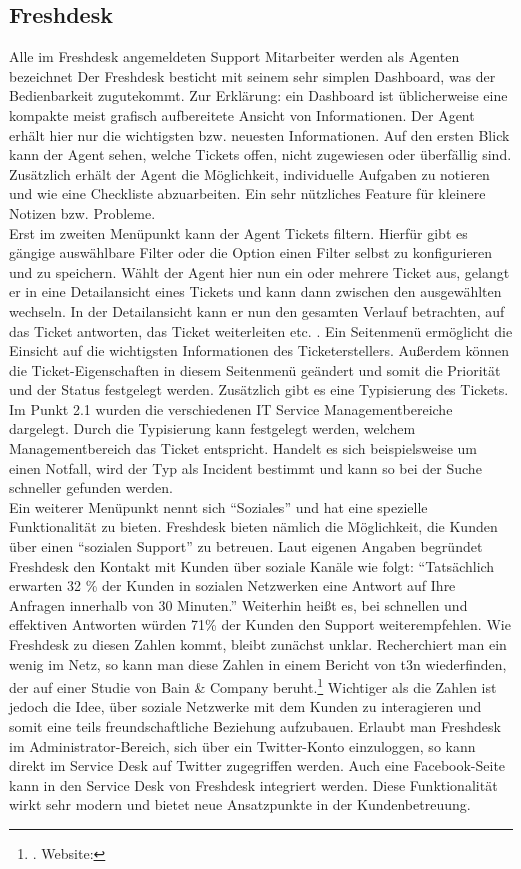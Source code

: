 \subsection{Freshdesk}
\noindent
Alle im Freshdesk angemeldeten Support Mitarbeiter werden als Agenten bezeichnet
Der Freshdesk besticht mit seinem sehr simplen Dashboard, was der Bedienbarkeit zugutekommt. Zur Erklärung: ein Dashboard ist üblicherweise eine kompakte meist grafisch aufbereitete Ansicht von Informationen. Der Agent erhält hier nur die wichtigsten bzw. neuesten Informationen. Auf den ersten Blick kann der Agent sehen, welche Tickets offen, nicht zugewiesen oder überfällig sind. Zusätzlich erhält der Agent die Möglichkeit, individuelle Aufgaben zu notieren und wie eine Checkliste abzuarbeiten. Ein sehr nützliches Feature für kleinere Notizen bzw. Probleme.\\ 
Erst im zweiten Menüpunkt kann der Agent Tickets filtern. Hierfür gibt es gängige auswählbare Filter oder die Option einen Filter selbst zu konfigurieren und zu speichern. Wählt der Agent hier nun ein oder mehrere Ticket aus, gelangt er in eine Detailansicht eines Tickets und kann dann zwischen den ausgewählten wechseln. In der Detailansicht kann er nun den gesamten Verlauf betrachten, auf das Ticket antworten, das Ticket weiterleiten etc. . Ein Seitenmenü ermöglicht die Einsicht auf die wichtigsten Informationen des Ticketerstellers. Außerdem können die Ticket-Eigenschaften in diesem Seitenmenü geändert und somit die Priorität und der Status festgelegt werden. Zusätzlich gibt es eine Typisierung des Tickets. Im Punkt 2.1 wurden die verschiedenen IT Service Managementbereiche dargelegt. Durch die Typisierung kann festgelegt werden, welchem Managementbereich das Ticket entspricht. Handelt es sich beispielsweise um einen Notfall, wird der Typ als Incident bestimmt und kann so bei der Suche schneller gefunden werden.\\
Ein weiterer Menüpunkt nennt sich \enquote{Soziales} und hat eine spezielle Funktionalität zu bieten. Freshdesk bieten nämlich die Möglichkeit, die Kunden über einen \enquote{sozialen Support} zu betreuen. Laut eigenen Angaben begründet Freshdesk den Kontakt mit Kunden über soziale Kanäle wie folgt: \enquote{Tatsächlich erwarten 32 \% der Kunden in sozialen Netzwerken eine Antwort auf Ihre Anfragen innerhalb von 30 Minuten.} Weiterhin heißt es, bei schnellen und effektiven Antworten würden 71\% der Kunden den Support weiterempfehlen. Wie Freshdesk zu diesen Zahlen kommt, bleibt zunächst unklar. Recherchiert man ein wenig im Netz, so kann man diese Zahlen in einem Bericht von t3n wiederfinden, der auf einer Studie von  Bain \& Company beruht.\footnote{\citeauthor{Rixecker}. Website:\cite{Rixecker}} Wichtiger als die Zahlen ist jedoch die Idee, über soziale Netzwerke mit dem Kunden zu interagieren und somit eine teils freundschaftliche Beziehung aufzubauen. Erlaubt man Freshdesk im Administrator-Bereich, sich über ein Twitter-Konto einzuloggen, so kann direkt im Service Desk auf Twitter zugegriffen werden. Auch eine Facebook-Seite kann in den Service Desk von Freshdesk integriert werden. Diese Funktionalität wirkt sehr modern und bietet neue Ansatzpunkte in der Kundenbetreuung.\\
